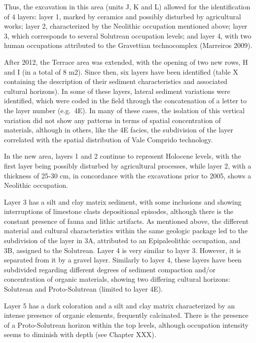 \documentclass[12pt,twoside]{reedthesis}
\begin{document}
Thus, the excavation in this area (units J, K and L) allowed for the identification of 4 layers: layer 1, marked by ceramics and possibly disturbed by agricultural works; layer 2, characterized by the Neolithic occupation mentioned above; layer 3, which corresponds to several Solutrean occupation levels; and layer 4, with two human occupations attributed to the Gravettian technocomplex (Marreiros 2009).

After 2012, the Terrace area was extended, with the opening of two new rows, H and I (in a total of 8 m2). Since then, six layers have been identified (table X containing the description of their sediment characteristics and associated cultural horizons). In some of these layers, lateral sediment variations were identified, which were coded in the field through the concatenation of a letter to the layer number (e.g.~4E). In many of these cases, the isolation of this vertical variation did not show any patterns in terms of spatial concentration of materials, although in others, like the 4E facies, the subdivision of the layer correlated with the spatial distribution of Vale Comprido technology.

In the new area, layers 1 and 2 continue to represent Holocene levels, with the first layer being possibly disturbed by agricultural processes, while layer 2, with a thickness of 25-30 cm, in concordance with the excavations prior to 2005, shows a Neolithic occupation.

Layer 3 has a silt and clay matrix sediment, with some inclusions and showing interruptions of limestone clasts depositional episodes, although there is the constant presence of fauna and lithic artifacts. As mentioned above, the different material and cultural characteristics within the same geologic package led to the subdivision of the layer in 3A, attributed to an Epipaleolithic occupation, and 3B, assigned to the Solutrean.
Layer 4 is very similar to layer 3. However, it is separated from it by a gravel layer. Similarly to layer 4, these layers have been subdivided regarding different degrees of sediment compaction and/or concentration of organic materials, showing two differing cultural horizons: Solutrean and Proto-Solutrean (limited to layer 4E).

Layer 5 has a dark coloration and a silt and clay matrix characterized by an intense presence of organic elements, frequently calcinated. There is the presence of a Proto-Solutrean horizon within the top levels, although occupation intensity seems to diminish with depth (see Chapter XXX).
\end{document}
